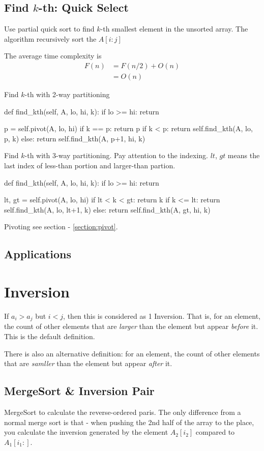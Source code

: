 \subsection{Find $k$-th: Quick Select}
Use partial quick sort to find $k$-th smallest element in the unsorted array. The algorithm recursively sort the $A[i:j]$

The average time complexity is
\begin{align*}
F(n) &= F(n/2) + O(n) \\
&= O(n)
\end{align*}

Find $k$-th with 2-way partitioning
\begin{python}
def find_kth(self, A, lo, hi, k):
    if lo >= hi: return
    
    p = self.pivot(A, lo, hi)
    if k == p: return p
    if k < p:  return self.find_kth(A, lo, p, k)
    else:      return self.find_kth(A, p+1, hi, k)
\end{python}
Find $k$-th with 3-way partitioning. Pay attention to the indexing. $lt$, $gt$ means the last index of less-than portion and larger-than partion. 
\begin{python}
def find_kth(self, A, lo, hi, k):
    if lo >= hi: return

    lt, gt = self.pivot(A, lo, hi)
    if lt < k < gt: return k
    if k <= lt: return self.find_kth(A, lo, lt+1, k)
    else:       return self.find_kth(A, gt, hi, k)
\end{python}

Pivoting see section - \ref{section:pivot}.

\subsection{Applications}
\section{Inversion}
If $a_i > a_j$ but $i<j$, then this is considered as 1 Inversion. That is, for an element, the count of other elements that are \textit{larger} than the element but appear \textit{before} it. This is the default definition. 

There is also an alternative definition: for an element, the count of other elements that are \textit{samller} than the element but appear \textit{after} it. 

\subsection{MergeSort \& Inversion Pair}
MergeSort to calculate the reverse-ordered paris. The only difference from a normal
merge sort is that - when pushing the 2nd half of the array to the place, you calculate
the inversion generated by the element $A_2[i_2]$ compared to $A_1[i_1:]$.

